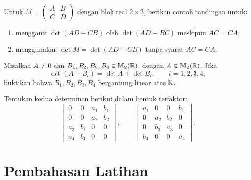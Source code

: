 \begin{latihan}\label{det:lat-blok-syarat}
      Untuk $M=\left(\begin{smallmatrix}A&B\\C&D\end{smallmatrix}\right)$
      dengan blok real $2\times2$, berikan contoh tandingan untuk:
      \begin{enumerate}[label=(\alph*)]
            \item mengganti $\det(AD-CB)$ oleh $\det(AD-BC)$ meskipun $AC=CA$;
            \item menggunakan $\det M=\det(AD-CB)$ tanpa syarat $AC=CA$.
      \end{enumerate}
\end{latihan}

\begin{latihan}\label{det:lat-dependensi}
      Misalkan $A\ne0$ dan $B_1,B_2,B_3,B_4\in\mathbb{M}_2(\mathbb{R})$, dengan
      $A\in\mathbb{M}_2(\mathbb{R})$. Jika
      \[
            \det(A+B_i)=\det A+\det B_i,\qquad i=1,2,3,4,
      \]
      buktikan bahwa $B_1,B_2,B_3,B_4$ bergantung linear atas $\mathbb{R}$.
\end{latihan}

\begin{latihan}\label{det:lat-permutasiblok}
      Tentukan kedua determinan berikut dalam bentuk terfaktor:
      \[
            \begin{vmatrix}
                  0 & 0 & a_1 & b_1 \\0&0&a_2&b_2\\a_3&b_3&0&0\\a_4&b_4&0&0
            \end{vmatrix},\qquad
            \begin{vmatrix}
                  a_1 & 0 & 0 & b_1 \\0&a_2&b_2&0\\0&b_3&a_3&0\\b_4&0&0&a_4
            \end{vmatrix}.
      \]
\end{latihan}

\ifpembahasan
      \clearpage
      \section{Pembahasan Latihan}
      \label{det:pembahasan}

